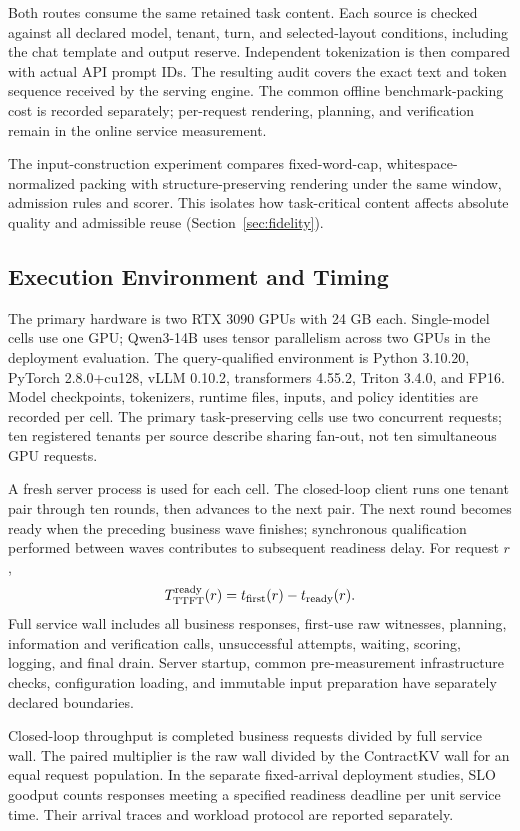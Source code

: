 Both routes consume the same retained task content. Each source is checked against all declared model, tenant, turn, and selected-layout conditions, including the chat template and output reserve. Independent tokenization is then compared with actual API prompt IDs. The resulting audit covers the exact text and token sequence received by the serving engine. The common offline benchmark-packing cost is recorded separately; per-request rendering, planning, and verification remain in the online service measurement.

The input-construction experiment compares fixed-word-cap, whitespace-normalized packing with structure-preserving rendering under the same window, admission rules and scorer. This isolates how task-critical content affects absolute quality and admissible reuse (Section~\ref{sec:fidelity}).

\subsection{Execution Environment and Timing}
The primary hardware is two RTX 3090 GPUs with 24 GB each. Single-model cells use one GPU; Qwen3-14B uses tensor parallelism across two GPUs in the deployment evaluation. The query-qualified environment is Python 3.10.20, PyTorch 2.8.0+cu128, vLLM 0.10.2, transformers 4.55.2, Triton 3.4.0, and FP16. Model checkpoints, tokenizers, runtime files, inputs, and policy identities are recorded per cell. The primary task-preserving cells use two concurrent requests; ten registered tenants per source describe sharing fan-out, not ten simultaneous GPU requests.

A fresh server process is used for each cell. The closed-loop client runs one tenant pair through ten rounds, then advances to the next pair. The next round becomes ready when the preceding business wave finishes; synchronous qualification performed between waves contributes to subsequent readiness delay. For request $r$,
\begin{equation}
 T^{\rm ready}_{\rm TTFT}(r)=t_{\rm first}(r)-t_{\rm ready}(r).
\end{equation}
Full service wall includes all business responses, first-use raw witnesses, planning, information and verification calls, unsuccessful attempts, waiting, scoring, logging, and final drain. Server startup, common pre-measurement infrastructure checks, configuration loading, and immutable input preparation have separately declared boundaries.

Closed-loop throughput is completed business requests divided by full service wall. The paired multiplier is the raw wall divided by the ContractKV wall for an equal request population. In the separate fixed-arrival deployment studies, SLO goodput counts responses meeting a specified readiness deadline per unit service time. Their arrival traces and workload protocol are reported separately.

